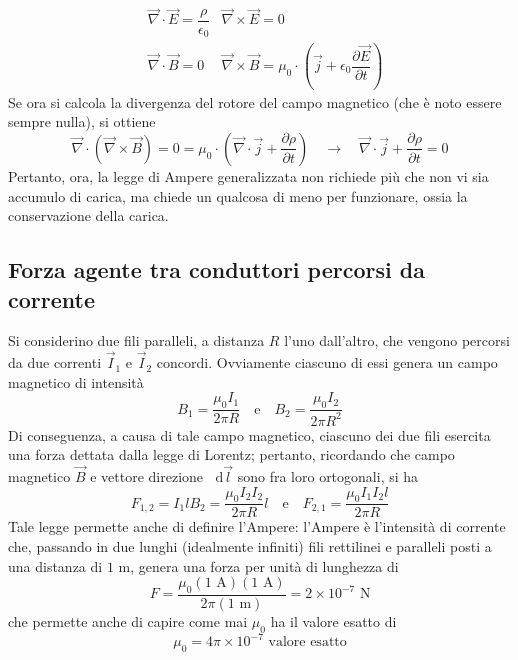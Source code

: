 \documentclass[a4paper]{extarticle}
\newcommand\dif{\mathop{}\!\mathrm{d}}
\begin{document}
\begin{align*}
  &\vec \nabla \cdot \vec E = \dfrac{\rho}{\epsilon_0} & \vec \nabla \times \vec E = 0\\
  &\vec \nabla \cdot \vec B = 0 & \vec \nabla \times \vec B = \mu_0 \cdot \left(\vec j + \epsilon_0 \dfrac{\partial \vec E}{\partial t}\right)
\end{align*}
Se ora si calcola la divergenza del rotore del campo magnetico (che è noto essere sempre nulla), si ottiene
\[\vec \nabla \cdot \left(\vec \nabla \times \vec B\right) = 0 = \mu_0 \cdot \left(\vec \nabla \cdot \vec j + \dfrac{\partial \rho}{\partial t}\right) \hspace{1em} \rightarrow \hspace{1em} \vec \nabla \cdot \vec j + \dfrac{\partial \rho}{\partial t} = 0\]
Pertanto, ora, la legge di Ampere generalizzata non richiede più che non vi sia accumulo di carica, ma chiede un qualcosa di meno per funzionare, ossia la conservazione della carica.

\vspace{1em}
\noindent
\subsection{Forza agente tra conduttori percorsi da corrente}
Si considerino due fili paralleli, a distanza $R$ l'uno dall'altro, che vengono percorsi da due correnti $\vec I_1$ e $\vec I_2$ concordi. Ovviamente ciascuno di essi genera un campo magnetico di intensità
\[B_1=\dfrac{\mu_0 I_1}{2 \pi R} \hspace{1em} \text{e} \hspace{1em} B_2=\dfrac{\mu_0 I_2}{2 \pi R^2}\]
Di conseguenza, a causa di tale campo magnetico, ciascuno dei due fili esercita una forza dettata dalla legge di Lorentz; pertanto, ricordando che campo magnetico $\vec B$ e vettore direzione $\dif \vec l$ sono fra loro ortogonali, si ha
\[F_{1,2} = I_1 l B_2 = \dfrac{\mu_0 I_2 I_2}{2 \pi R} l \hspace{1em} \text{e} \hspace{1em} F_{2,1} = \dfrac{\mu_0 I_1 I_2 l}{2 \pi R}\]
Tale legge permette anche di definire l'Ampere: l'Ampere è l'intensità di corrente che, passando in due lunghi (idealmente infiniti) fili rettilinei e paralleli posti a una distanza di $1$ m, genera una forza per unità di lunghezza di
\[F=\dfrac{\mu_0 (1\text{ A}) (1\text{ A})}{2 \pi (1\text{ m})} = 2\times 10^{-7} \text{ N}\]
che permette anche di capire come mai $\mu_0$ ha il valore esatto di
\[\mu_0 = 4\pi \times 10^{-7} \text{ valore esatto}\]
\end{document}
